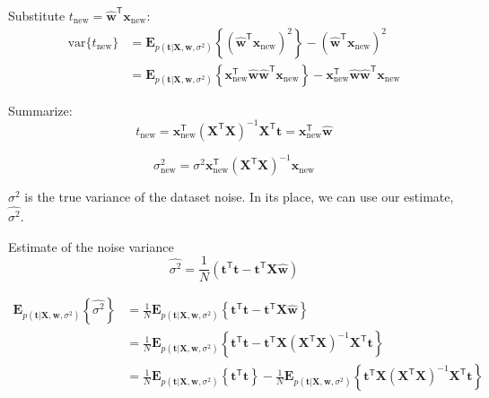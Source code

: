 \documentclass[a4paper,11pt]{article} %
\begin{document}
Substitute $t_{\mathrm{new}} = \hat{\mathbf{w}}^{\mathsf{T}}\mathbf{x}_{\mathrm{new}}$:
\begin{align*}
\mathrm{var}\{t_{\mathrm{new}}\} & =
\mathbf{E}_{p(\mathbf{t}|\mathbf{X},\mathbf{w},\sigma^2)}\left\{
\left(\hat{\mathbf{w}}^{\mathsf{T}}\mathbf{x}_{\mathrm{new}}\right)^2
\right\} - \left(\hat{\mathbf{w}}^{\mathsf{T}}\mathbf{x}_{\mathrm{new}}\right)^2 \\
& = \mathbf{E}_{p(\mathbf{t}|\mathbf{X},\mathbf{w},\sigma^2)}\left\{
\mathbf{x}_{\mathrm{new}}^{\mathsf{T}} \hat{\mathbf{w}}
\hat{\mathbf{w}}^{\mathsf{T}} \mathbf{x}_{\mathrm{new}}
\right\} - \mathbf{x}_{\mathrm{new}}^{\mathsf{T}} \hat{\mathbf{w}}
\hat{\mathbf{w}}^{\mathsf{T}} \mathbf{x}_{\mathrm{new}}
\end{align*}

Summarize:
\begin{equation}
t_{\mathrm{new}} = \mathbf{x}_{\mathrm{new}}^{\mathsf{T}}
(\mathbf{X}^{\mathsf{T}}\mathbf{X})^{-1}
\mathbf{X}^{\mathsf{T}}\mathbf{t} = 
\mathbf{x}_{\mathrm{new}}^{\mathsf{T}} \hat{\mathbf{w}}
\end{equation}

\begin{equation}
\sigma^2_{\mathrm{new}} = \sigma^{2} \mathbf{x}^{\mathsf{T}}_{\mathrm{new}}
(\mathbf{X}^{\mathsf{T}}\mathbf{X})^{-1} \mathbf{x}_{\mathrm{new}}
\end{equation}

$\sigma^2$ is the true variance of the dataset noise. In its place, we can use our
estimate, $\widehat{\sigma^2}$.

Estimate of the noise variance
\begin{equation}
\widehat{\sigma^2} = \frac{1}{N}
\left( \mathbf{t}^{\mathsf{T}}\mathbf{t} - 
\mathbf{t}^{\mathsf{T}}\mathbf{X}\widehat{\mathbf{w}}
\right)
\end{equation}


\begin{align*}
\mathbf{E}_{p(\mathbf{t}|\mathbf{X},\mathbf{w},\sigma^2)}
\left\{\widehat{\sigma^2}\right\} & =
\frac{1}{N} \mathbf{E}_{p(\mathbf{t}|\mathbf{X},\mathbf{w},\sigma^2)}
\left\{
\mathbf{t}^{\mathsf{T}}\mathbf{t} - 
\mathbf{t}^{\mathsf{T}}\mathbf{X}\widehat{\mathbf{w}}
\right\} \\
& = \frac{1}{N}\mathbf{E}_{p(\mathbf{t}|\mathbf{X},\mathbf{w},\sigma^2)}
\left\{
\mathbf{t}^{\mathsf{T}}\mathbf{t} - 
\mathbf{t}^{\mathsf{T}}\mathbf{X} (\mathbf{X}^{\mathsf{T}}\mathbf{X})^{-1}
\mathbf{X}^{\mathsf{T}}\mathbf{t}
\right\} \\
& = \frac{1}{N}\mathbf{E}_{p(\mathbf{t}|\mathbf{X},\mathbf{w},\sigma^2)}
\left\{ \mathbf{t}^{\mathsf{T}}\mathbf{t} \right\} -
\frac{1}{N}\mathbf{E}_{p(\mathbf{t}|\mathbf{X},\mathbf{w},\sigma^2)}
\left\{
\mathbf{t}^{\mathsf{T}}\mathbf{X} (\mathbf{X}^{\mathsf{T}}\mathbf{X})^{-1}
\mathbf{X}^{\mathsf{T}}\mathbf{t}
\right\}
\end{align*}
\end{document}
